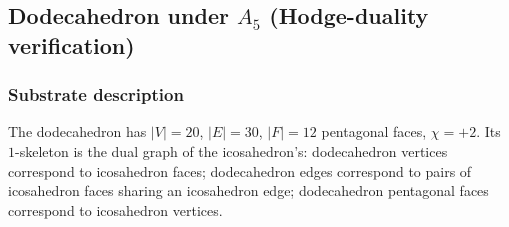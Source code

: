 \documentclass[12pt,a4paper]{article}
\theoremstyle{definition}
\theoremstyle{remark}
\begin{document}
\subsection{Dodecahedron under $A_5$ (Hodge-duality verification)}\label{sec:dodec}

\subsubsection{Substrate description}\label{sec:dodec-description}

The dodecahedron has $|V| = 20$, $|E| = 30$, $|F| = 12$ pentagonal faces,
$\chi = +2$. Its $1$-skeleton is the dual graph of the icosahedron's:
dodecahedron vertices correspond to icosahedron faces; dodecahedron
edges correspond to pairs of icosahedron faces sharing an icosahedron
edge; dodecahedron pentagonal faces correspond to icosahedron vertices.
\end{document}
